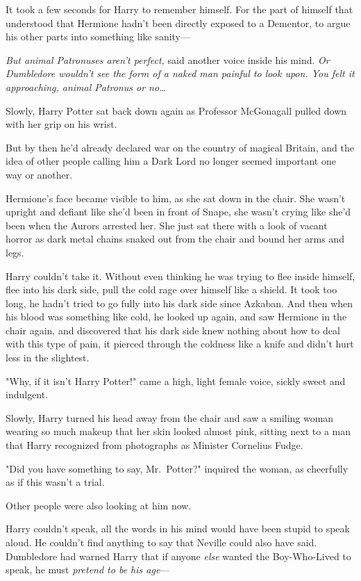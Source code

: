 It took a few seconds for Harry to remember himself. For the part of himself
that understood that Hermione hadn't been directly exposed to a Dementor, to
argue his other parts into something like sanity---

\emph{But animal Patronuses aren't perfect,} said another voice inside his
mind. \emph{Or Dumbledore wouldn't see the form of a naked man painful to look
upon. You felt it approaching, animal Patronus or no{\ldots}}

Slowly, Harry Potter sat back down again as Professor McGonagall pulled down
with her grip on his wrist.

But by then he'd already declared war on the country of magical Britain, and
the idea of other people calling him a Dark Lord no longer seemed important one
way or another.

Hermione's face became visible to him, as she sat down in the chair. She wasn't
upright and defiant like she'd been in front of Snape, she wasn't crying like
she'd been when the Aurors arrested her. She just sat there with a look of
vacant horror as dark metal chains snaked out from the chair and bound her arms
and legs.

Harry couldn't take it. Without even thinking he was trying to flee inside
himself, flee into his dark side, pull the cold rage over himself like a
shield. It took too long, he hadn't tried to go fully into his dark side since
Azkaban. And then when his blood was something like cold, he looked up again,
and saw Hermione in the chair again, and discovered that his dark side knew
nothing about how to deal with this type of pain, it pierced through the
coldness like a knife and didn't hurt less in the slightest.

"Why, if it isn't Harry Potter!" came a high, light female voice, sickly sweet
and indulgent.

Slowly, Harry turned his head away from the chair and saw a smiling woman
wearing so much makeup that her skin looked almost pink, sitting next to a man
that Harry recognized from photographs as Minister Cornelius Fudge.

"Did you have something to say, Mr.~Potter?" inquired the woman, as cheerfully
as if this wasn't a trial.

Other people were also looking at him now.

Harry couldn't speak, all the words in his mind would have been stupid to speak
aloud. He couldn't find anything to say that Neville could also have said.
Dumbledore had warned Harry that if anyone \emph{else} wanted the Boy-Who-Lived
to speak, he must \emph{pretend to be his age}---


